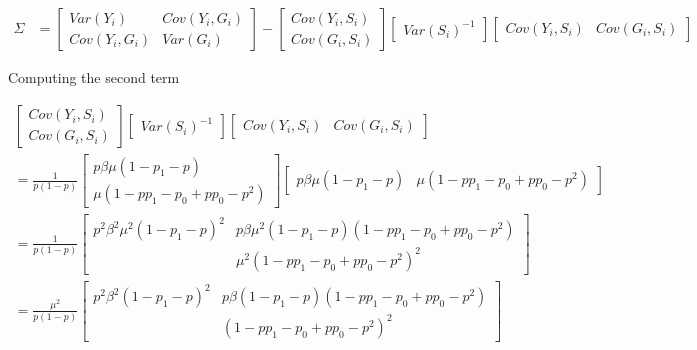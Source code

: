 \documentclass{article}
\begin{document}
\begin{align*}
  \Sigma & = \begin{bmatrix}
    Var(Y_i) & Cov(Y_i, G_i) \\
    Cov(Y_i, G_i) & Var(G_i)
  \end{bmatrix} - 
  \begin{bmatrix}
    Cov(Y_i, S_i) \\ Cov(G_i,S_i)
  \end{bmatrix}
  \begin{bmatrix}
    Var(S_i)^{-1}
  \end{bmatrix}
  \begin{bmatrix}
    Cov(Y_i, S_i) & Cov(G_i,S_i)
  \end{bmatrix}
\end{align*}

Computing the second term

\begin{align*}
  \begin{bmatrix}
    Cov(Y_i, S_i) \\ Cov(G_i,S_i)
  \end{bmatrix}
  \begin{bmatrix}
    Var(S_i)^{-1}
  \end{bmatrix}
  \begin{bmatrix}
    Cov(Y_i, S_i) & Cov(G_i,S_i)
  \end{bmatrix} \\ 
  = \frac 1{p(1-p)}
  \begin{bmatrix}
    p\beta\mu(1-p_1 - p) \\ \mu(1-pp_1-p_0 + pp_0 - p^2)
  \end{bmatrix}
  \begin{bmatrix}
    p\beta\mu(1-p_1 - p) & \mu(1-pp_1-p_0 + pp_0 - p^2) 
  \end{bmatrix} \\ 
  = \frac 1{p(1-p)}
  \begin{bmatrix}
    p^2\beta^2\mu^2(1-p_1 - p)^2 & p\beta\mu^2(1-p_1-p)(1-pp_1-p_0 + pp_0 - p^2) \\
     & \mu^2(1-pp_1-p_0 + pp_0 - p^2)^2
  \end{bmatrix} \\
  = \frac {\mu^2}{p(1-p)}
  \begin{bmatrix}
    p^2\beta^2(1-p_1 - p)^2 & p\beta(1-p_1-p)(1-pp_1-p_0 + pp_0 - p^2) \\
     & (1-pp_1-p_0 + pp_0 - p^2)^2
  \end{bmatrix}
\end{align*}
\end{document}
